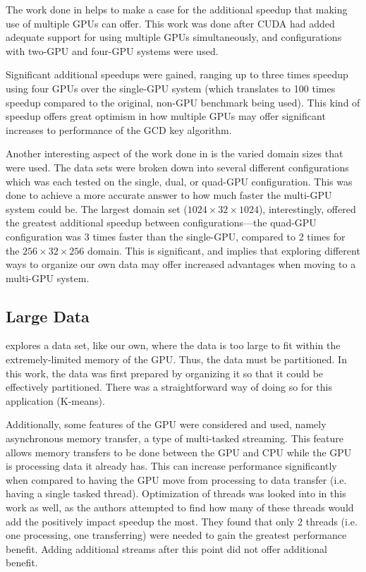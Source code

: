 \documentclass[smallextended]{svjour3}       %
\begin{document}
The work done in \cite{thibault2009cuda} helps to make a case for the
additional speedup that making use of multiple GPUs can offer. This work was
done after CUDA had added adequate support for using multiple GPUs
simultaneously, and configurations with two-GPU and four-GPU systems were used.

Significant additional speedups were gained, ranging up to three times speedup
using four GPUs over the single-GPU system (which translates to 100 times
speedup compared to the original, non-GPU benchmark being used). This kind of
speedup offers great optimism in how multiple GPUs may offer significant
increases to performance of the GCD key algorithm.

Another interesting aspect of the work done in \cite{thibault2009cuda} is the
varied domain sizes that were used. The data sets were broken down into several
different configurations which was each tested on the single, dual, or quad-GPU
configuration. This was done to achieve a more accurate answer to how much
faster the multi-GPU system could be. The largest domain set
($1024\times32\times1024$), interestingly, offered the greatest additional
speedup between configurations---the quad-GPU configuration was 3 times faster
than the single-GPU, compared to 2 times for the $256\times32\times256$
domain. This is significant, and implies that exploring different ways to
organize our own data may offer increased advantages when moving to a multi-GPU
system.

\subsection{Large Data}
\label{subsec:largedata}
\cite{wu2009clustering} explores a data set, like our own, where the data is
too large to fit within the extremely-limited memory of the GPU. Thus, the data
must be partitioned. In this work, the data was first prepared by organizing it
so that it could be effectively partitioned. There was a straightforward way of
doing so for this application (K-means).  

Additionally, some features of the GPU were considered and used, namely
asynchronous memory transfer, a type of multi-tasked streaming. This feature
allows memory transfers to be done between the GPU and CPU while the GPU is
processing data it already has. This can increase performance significantly
when compared to having the GPU move from processing to data transfer (i.e.
having a single tasked thread). Optimization of threads was looked into in this
work as well, as the authors attempted to find how many of these threads would
add the positively impact speedup the most. They found that only 2 threads
(i.e. one processing, one transferring) were needed to gain the greatest
performance benefit. Adding additional streams after this point did not offer
additional benefit.
\end{document}
